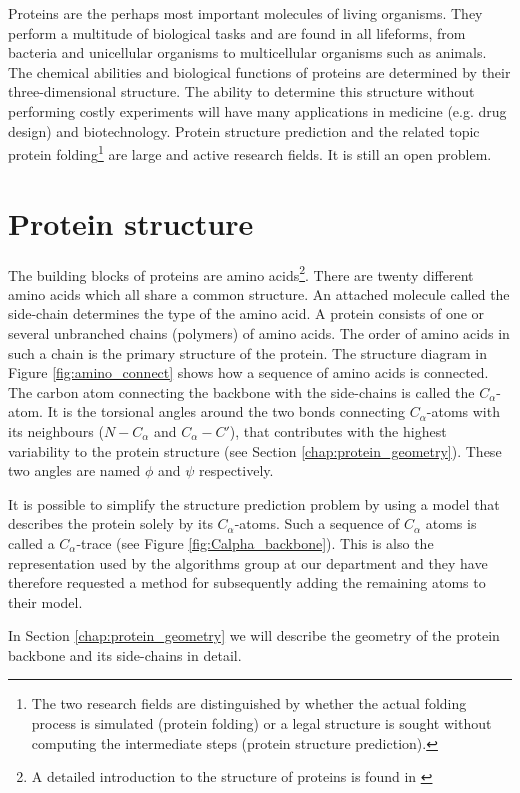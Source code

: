 Proteins are the perhaps most important molecules of living
organisms. They perform a multitude of biological tasks and are found
in all lifeforms, from bacteria and unicellular organisms to
multicellular organisms such as animals. The chemical abilities and
biological functions of proteins are determined by their
three-dimensional structure. The ability to determine this structure
without performing costly experiments will have many applications in
medicine (e.g. drug design) and biotechnology. Protein structure
prediction and the related topic protein folding\footnote{The two
  research fields are distinguished by whether the actual folding
  process is simulated (protein folding) or a legal structure is
  sought without computing the intermediate steps (protein structure
  prediction).} are large and active research fields. It is still an
open problem.

\section{Protein structure}
The building blocks of proteins are amino acids\footnote{A detailed
  introduction to the structure of proteins is found in
  \cite{branden}}. There are twenty different amino acids which all
share a common structure. An attached molecule called the side-chain
determines the type of the amino acid. A protein consists of one or
several unbranched chains (polymers) of amino acids. The order of
amino acids in such a chain is the primary structure of the protein.
The structure diagram in Figure \ref{fig:amino_connect} shows how a
sequence of amino acids is connected. The carbon atom connecting the
backbone with the side-chains is called the $C_\alpha$-atom. It is the
torsional angles around the two bonds connecting $C_\alpha$-atoms with
its neighbours ($N-C_\alpha$ and $C_\alpha-C'$), that contributes with
the highest variability to the protein structure
(see Section \ref{chap:protein_geometry}). These two angles are named
$\phi$ and $\psi$ respectively. 

It is possible to simplify the
structure prediction problem by using a model that describes the
protein solely by its $C_\alpha$-atoms. Such a sequence of
$C_{\alpha}$ atoms is called a $C_{\alpha}$-trace (see Figure
\ref{fig:Calpha_backbone}). This is also the representation used by
the algorithms group at our department and they have therefore
requested a method for subsequently adding the remaining atoms to
their model.

In Section \ref{chap:protein_geometry} we will describe the geometry
of the protein backbone and its side-chains in detail.


